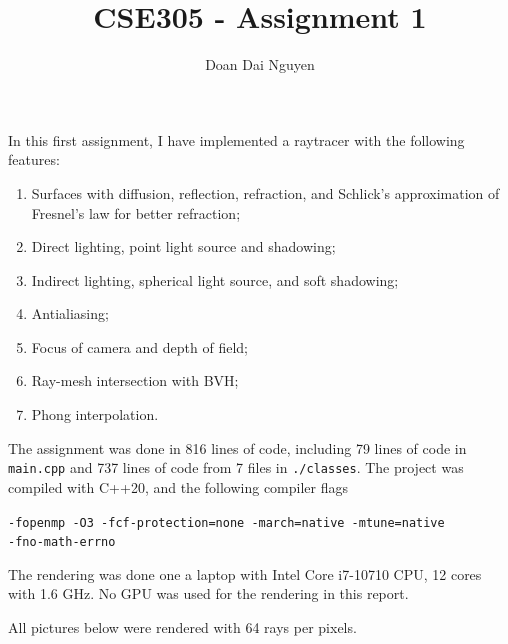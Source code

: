 \documentclass{amsart}
\title{CSE305 - Assignment 1}
\author{Doan Dai Nguyen}
\begin{document}
\maketitle

In this first assignment, I have implemented a raytracer with the following features:
\begin{enumerate}
    \item Surfaces with diffusion, reflection, refraction, and Schlick's approximation of Fresnel's law for better refraction;
    \item Direct lighting, point light source and shadowing;
    \item Indirect lighting, spherical light source, and soft shadowing;
    \item Antialiasing;
    \item Focus of camera and depth of field;
    \item Ray-mesh intersection with BVH;
    \item Phong interpolation.
\end{enumerate}

The assignment was done in 816 lines of code, including 79 lines of code in \texttt{main.cpp} and 737 lines of code from 7 files in \texttt{./classes}. The project was compiled with C++20, and the following compiler flags

\texttt{-fopenmp -O3 -fcf-protection=none -march=native -mtune=native \\-fno-math-errno}

The rendering was done one a laptop with Intel Core i7-10710 CPU, 12 cores with 1.6 GHz. No GPU was used for the rendering in this report.

All pictures below were rendered with 64 rays per pixels.
\end{document}
